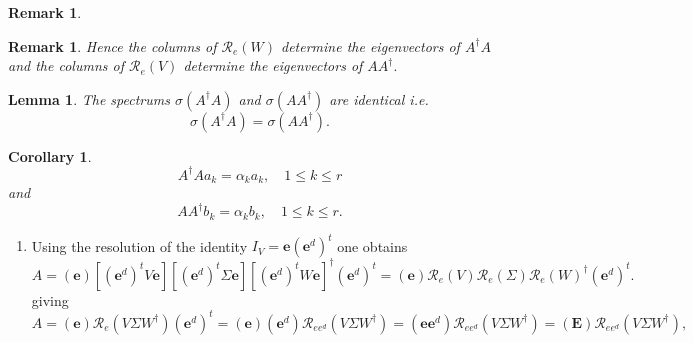 \documentclass[aps,preprint]{revtex4}%
\newtheorem{corollary}[theorem]{Corollary}
\newtheorem{lemma}[theorem]{Lemma}
\newtheorem{remark}[theorem]{Remark}
\begin{document}
\begin{remark}
\begin{enumerate}
\begin{enumerate}
\end{enumerate}
\end{enumerate}
\end{remark}

\begin{remark}
Hence the \emph{columns} of $\mathcal{R}_{e}\left(  W\right)  $ determine the
eigenvectors of $A^{\dagger}A$ and the \emph{columns} of $\mathcal{R}%
_{e}\left(  V\right)  $ determine the eigenvectors of $AA^{\dagger}.$
\end{remark}

\begin{lemma}
The spectrums $\sigma\left(  A^{\dagger}A\right)  $ and $\sigma\left(
AA^{\dagger}\right)  $ are identical i.e.
\begin{equation}
\sigma\left(  A^{\dagger}A\right)  =\sigma\left(  AA^{\dagger}\right)  .
\end{equation}

\end{lemma}

\begin{corollary}%
\begin{equation}
A^{\dagger}Aa_{k}=\alpha_{k}a_{k},\quad1\leq k\leq r
\end{equation}
and
\begin{equation}
AA^{\dagger}b_{k}=\alpha_{k}b_{k},\quad1\leq k\leq r.
\end{equation}

\end{corollary}

\begin{enumerate}
\item[4] Using the resolution of the identity $I_{V}=\mathbf{e}\left(
\mathbf{e}^{d}\right)  ^{t}$ one obtains
\begin{equation}
A=\left(  \mathbf{e}\right)  \left[  \left(  \mathbf{e}^{d}\right)
^{t}V\mathbf{e}\right]  \left[  \left(  \mathbf{e}^{d}\right)  ^{t}%
\Sigma\mathbf{e}\right]  \left[  \left(  \mathbf{e}^{d}\right)  ^{t}%
W\mathbf{e}\right]  ^{\dagger}\left(  \mathbf{e}^{d}\right)  ^{t}=\left(
\mathbf{e}\right)  \mathcal{R}_{e}\left(  V\right)  \mathcal{R}_{e}\left(
\Sigma\right)  \mathcal{R}_{e}\left(  W\right)  ^{\dagger}\left(
\mathbf{e}^{d}\right)  ^{t}.
\end{equation}
giving
\begin{equation}
A=\left(  \mathbf{e}\right)  \mathcal{R}_{e}\left(  V\Sigma W^{\dagger
}\right)  \left(  \mathbf{e}^{d}\right)  ^{t}=\left(  \mathbf{e}\right)
\left(  \mathbf{e}^{d}\right)  \mathcal{R}_{ee^{d}}\left(  V\Sigma W^{\dagger
}\right)  =\left(  \mathbf{ee}^{d}\right)  \mathcal{R}_{ee^{d}}\left(  V\Sigma
W^{\dagger}\right)  =\left(  \mathbf{E}\right)  \mathcal{R}_{ee^{d}}\left(
V\Sigma W^{\dagger}\right)  ,
\end{equation}

\end{enumerate}
\end{document}
